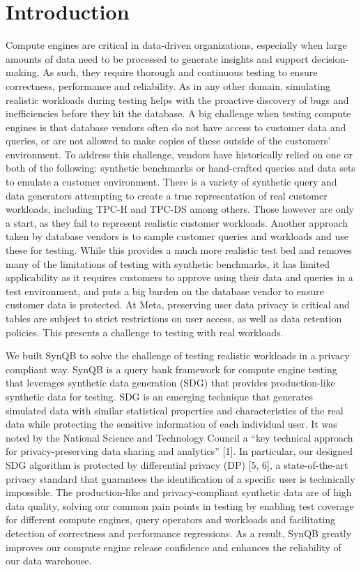 \documentclass[11pt]{article}
\begin{document}
\section{Introduction}
Compute engines are critical in data-driven organizations, especially
when large amounts of data need to be processed to generate
insights and support decision-making. As such, they require thorough
and continuous testing to ensure correctness, performance
and reliability. As in any other domain, simulating realistic workloads
during testing helps with the proactive discovery of bugs and
inefficiencies before they hit the database. A big challenge when
testing compute engines is that database vendors often do not have
access to customer data and queries, or are not allowed to make
copies of these outside of the customers' environment. To address
this challenge, vendors have historically relied on one or both of
the following: synthetic benchmarks or hand-crafted queries and
data sets to emulate a customer environment. There is a variety
of synthetic query and data generators attempting to create a true
representation of real customer workloads, including TPC-H and
TPC-DS among others. Those however are only a start, as they
fail to represent realistic customer workloads. Another approach
taken by database vendors is to sample customer queries and workloads
and use these for testing. While this provides a much more
realistic test bed and removes many of the limitations of testing
with synthetic benchmarks, it has limited applicability as it requires
customers to approve using their data and queries in a test environment,
and puts a big burden on the database vendor to ensure
customer data is protected. At Meta, preserving user data privacy is
critical and tables are subject to strict restrictions on user access, as
well as data retention policies. This presents a challenge to testing
with real workloads.

We built SynQB to solve the challenge of testing realistic workloads
in a privacy compliant way. SynQB is a query bank framework
for compute engine testing that leverages synthetic data generation
(SDG) that provides production-like synthetic data for testing.
SDG is an emerging technique that generates simulated data with
similar statistical properties and characteristics of the real data
while protecting the sensitive information of each individual user.
It was noted by the National Science and Technology Council a ``key
technical approach for privacy-preserving data sharing and analytics''
[1]. In particular, our designed SDG algorithm is protected by
differential privacy (DP) [5, 6], a state-of-the-art privacy standard
that guarantees the identification of a specific user is technically
impossible. The production-like and privacy-compliant synthetic
data are of high data quality, solving our common pain points in
testing by enabling test coverage for different compute engines,
query operators and workloads and facilitating detection of correctness
and performance regressions. As a result, SynQB greatly
improves our compute engine release confidence and enhances the
reliability of our data warehouse.
\end{document}
